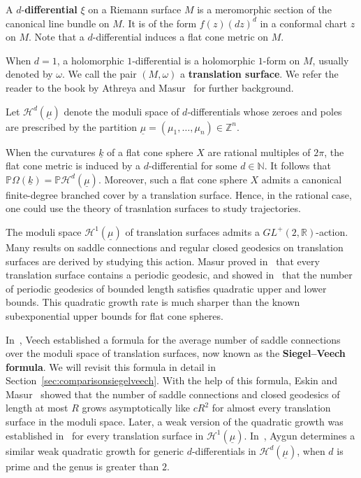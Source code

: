 \documentclass{compositio}
\numberwithin{equation}{section}
\numberwithin{figure}{section}
\theoremstyle{definition}
\theoremstyle{plain}
\begin{document}
{A $d$-\textbf{differential} $\xi$ on a Riemann surface $M$ is a meromorphic section of the canonical line bundle on $M$. It is of the form $f(z)(dz)^d$ in a conformal chart $z$ on $M$. Note that a $d$-differential induces a flat cone metric on $M$.

When $d=1$, a holomorphic $1$-differential is a holomorphic $1$-form on $M$, usually denoted by $\omega$. We call the pair $(M,\omega)$ a \textbf{translation surface}. We refer the reader to the book by Athreya and Masur~\cite{AthreyaMasur2024} for further background.

Let $\mathcal{H}^{d}(\underline{\mu})$ denote the moduli space of $d$-differentials whose zeroes and poles are prescribed by the partition $\underline{\mu} = (\mu_1, \ldots, \mu_n) \in \mathbb{Z}^n$. 

When the curvatures $\underline{k}$ of a flat cone sphere $X$ are rational multiples of $2\pi$, the flat cone metric is induced by a $d$-differential for some $d\in\mathbb{N}$. It follows that $\mathbb{P}\Omega(\underline{k}) = \mathbb{P}\mathcal{H}^{d}(\underline{\mu})$. Moreover, such a flat cone sphere $X$ admits a canonical finite-degree branched cover by a translation surface. Hence, in the rational case, one could use the theory of trasnlation surfaces to study trajectories.

The moduli space $\mathcal{H}^1(\underline{\mu})$ of translation surfaces admits a $GL^+(2,\mathbb{R})$-action. Many results on saddle connections and regular closed geodesics on translation surfaces are derived by studying this action. Masur proved in~\cite{Mas86} that every translation surface contains a periodic geodesic, and showed in~\cite{Ma1, Ma2} that the number of periodic geodesics of bounded length satisfies quadratic upper and lower bounds. This quadratic growth rate is much sharper than the known subexponential upper bounds for flat cone spheres.

In~\cite{Veech}, Veech established a formula for the average number of saddle connections over the moduli space of translation surfaces, now known as the \textbf{Siegel--Veech formula}. We will revisit this formula in detail in Section~\ref{sec:comparisonsiegelveech}. With the help of this formula, Eskin and Masur~\cite{EM} showed that the number of saddle connections and closed geodesics of length at most $R$ grows asymptotically like $cR^2$ for almost every translation surface in the moduli space. Later, a weak version of the quadratic growth was established in~\cite{EMirMoh} for every translation surface in $\mathcal{H}^1(\underline{\mu})$. In~\cite{aygun2025countinggeodesicsprimeorderkdifferentials}, Aygun determines a similar weak quadratic growth for generic $d$-differentials in $\mathcal{H}^d(\underline{\mu})$, when $d$ is prime and the genus is greater than $2$.

}
\end{document}
